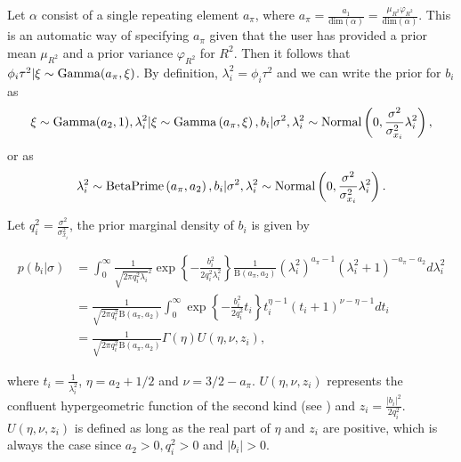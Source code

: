 	Let $\alpha$ consist of a single repeating element $a_\pi$, where $a_\pi= \frac{a_1}{\text{dim}(\alpha)}=\frac{\mu_{R^2}\varphi_{R^2}}{\text{dim}(\alpha)}$. This is an automatic way of specifying $a_\pi$ given that the user has provided a prior mean $\mu_{R^2}$ and a prior variance $\varphi_{R^2}$ for $R^2$. Then it follows that $\phi_{i} \tau^2 | \xi \sim \text{Gamma}( a_\pi, \xi )$. By definition, $\lambda_{i}^2= \phi_{i}\tau^2$ and we can write the prior for $b _{i}$ as
	\begin{align}
	\label{eq:r2d2altparam3}
		\xi \sim \text{Gamma} (a_2, 1) , \lambda_{i}^2| \xi \sim \text{Gamma} \left( a_\pi, \xi \right) ,
		 b_{i} | \sigma^2, \lambda_{i}^2 \sim \text{Normal} \left( 0, \frac{\sigma^2}{\sigma_{x_i}^2 } \lambda_i^2   \right),
	\end{align}
	or as
	\begin{align*}
		\lambda_{i}^2 \sim \text{BetaPrime} \left( a_\pi, a_2 \right),
		b_{i} |  \sigma^2, \lambda_{i}^2 \sim \text{Normal} \left( 0, \frac{\sigma^2}{\sigma_{x_i}^2 } \lambda_i^2\right).
	\end{align*}

	Let $q_i^2=\frac{\sigma^2}{\sigma_{x_i}^2}$, the prior marginal density of $b_i$ is given by

	\begin{align*}
		p( b_i | \sigma) &= \int_0^\infty \frac{1}{\sqrt{2\pi q_i^2 \lambda_{i}}^2 }\exp \left\lbrace  -\frac{ b_i^2  }{ 2 q_i^2\lambda_{i}^2}    \right\rbrace \frac{1}{\text{B}(a_\pi, a_2) } (\lambda_{i}^2)^{a_\pi-1} \left( \lambda_{i}^2+1
		\right)^{-a_\pi -a_2} d\lambda_{i}^2 \\
		&= \frac{1}{\sqrt{2\pi q_i^2} \text{B}(a_\pi, a_2) } \int_0^\infty \exp \left\lbrace  -\frac{ b_{i}^2  }{ 2q_i^2} t_i    \right\rbrace t_i^{\eta-1} (t_i+1)^{ \nu-\eta-1  } dt_i\\
		&= \frac{1}{ \sqrt{2\pi q_i^2} \text{B}(a_\pi, a_2) } \Gamma(\eta) U( \eta, \nu, z_i ),
	\end{align*}

	where $t_i=\frac{1}{\lambda_i^2}$, $\eta=a_2+1/2$ and $\nu= 3/2-a_\pi$. $U(\eta, \nu, z_i)$ represents the confluent hypergeometric function of the second kind (see \cite{Zwillinger}) and $z_i=\frac{|b_i|^2}{2q_i^2}$. $U(\eta,\nu, z_i)$ is defined as long as the real part of $\eta$ and $z_i$ are positive, which is always the case since $a_2>0, q_i^2>0$ and $|b_i|>0$. \\


